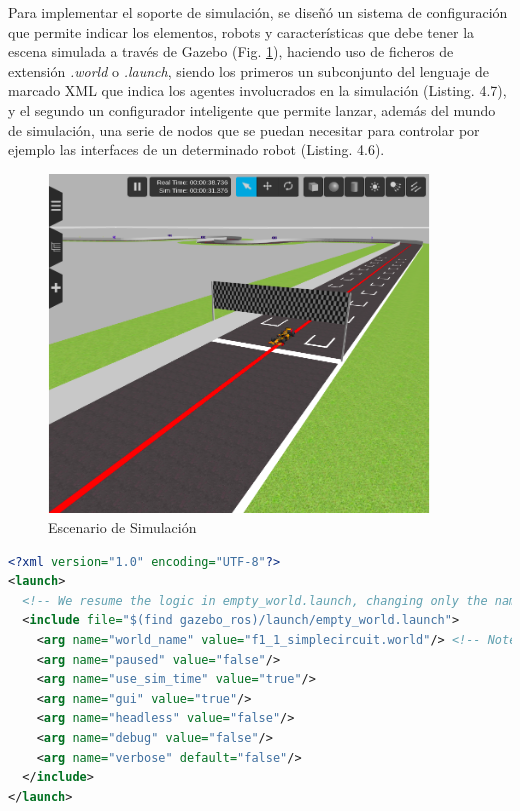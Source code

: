 Para implementar el soporte de simulación, se diseñó un sistema de configuración que permite indicar los elementos, robots y características que debe tener la escena simulada a través de Gazebo (Fig. \ref{gzworld}), haciendo uso de ficheros de extensión \textit{.world} o \textit{.launch}, siendo los primeros un subconjunto del lenguaje de marcado XML que indica los agentes involucrados en la simulación (Listing. 4.7), y el segundo un configurador inteligente que permite lanzar, además del mundo de simulación, una serie de nodos que se puedan necesitar para controlar por ejemplo las interfaces de un determinado robot (Listing. 4.6). 

\begin{figure}[!hbtp]  \centering\noindent
    \includegraphics[width=0.9\textwidth]{figures/world_gazebo.png}
    \caption{Escenario de Simulación}
    \label{gzworld}
\end{figure}

\begin{lstlisting}[language=XML, caption=Configuración de Lanzamiento de Simulaciones]
<?xml version="1.0" encoding="UTF-8"?>
<launch>
  <!-- We resume the logic in empty_world.launch, changing only the name of the world to be launched -->
  <include file="$(find gazebo_ros)/launch/empty_world.launch">
    <arg name="world_name" value="f1_1_simplecircuit.world"/> <!-- Note: the world_name is with respect to GAZEBO_RESOURCE_PATH environmental variable -->
    <arg name="paused" value="false"/>
    <arg name="use_sim_time" value="true"/>
    <arg name="gui" value="true"/>
    <arg name="headless" value="false"/>
    <arg name="debug" value="false"/>
    <arg name="verbose" default="false"/>
  </include>  
</launch>
\end{lstlisting}

